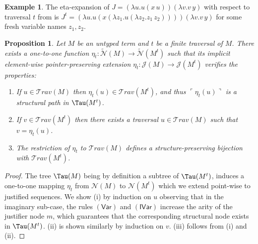 \documentclass[xchauthor,chkrefs,GCNS,amsmath,amsthm,rotating,leaveRGB]{tcsg}
\theoremstyle{plain}
\newtheorem{proposition}[theorem]{Proposition}
\theoremstyle{definition}
\newtheorem{example}{Example}[section]
\newcommand\travset{\mathcal{T}\!rav}
\newcommand{\Nodes}{\mathcal{N}}
\newcommand{\ExtendedNodes}{\tilde{\Nodes}}
\newcommand{\travulc}{\travset}
\newcommand{\ctree}{\Tau}
\begin{document}
\begin{example}
The eta-expansion of $J = (\lambda u . u(x\,u)) (\lambda v . v\,y)$ with
respect to traversal $t$ from  is
$J^{t} = (\lambda u . u(x (\lambda z_{1}. u (\lambda z_{2}.z_{1}\,z_{2}))))
(\lambda v . v\,y)$ for some fresh variable names $z_{1}, z_{2}$.
\end{example}


\begin{proposition}\label{prop:eta_expanded_trav}
Let $M$ be an untyped term and $t$ be a \emph{finite} traversal of $M$. There
exists a one-to-one function $\eta _{t} : \ExtendedNodes (M) \longrightarrow
\ExtendedNodes (M^{t})$ such that its implicit \emph{element-wise
pointer-preserving} extension $\eta _{t} : \mathcal{J}(M) \longrightarrow
\mathcal{J}(M^{t})$ verifies the properties:
%
\begin{enumerate}
\item[\textit{(i)}] If $u \in \travulc (M)$ then $\eta _{t}(u) \in \travulc
    (M^{t})$, and thus $\ulcorner  \eta  _{t}(u) \urcorner  $ is a
    \emph{structural} path in $\ctree (M^{t})$.

\item[\textit{(ii)}] If $v \in \travulc (M^{t})$ then there exists a traversal $u\in
    \travulc (M)$ such that $v = \eta _{t}(u)$.

\item[\textit{(iii)}] The restriction of $\eta _{t}$ to $\mathcal {T}\!rav(M)$
    defines a structure-preserving bijection with $\mathcal
    {T}\!rav(M^{t})$.
\end{enumerate}
\end{proposition}

\begin{proof}
The tree $\ctree (M)$ being by definition a subtree of $\ctree (M^{t})$,
induces a one-to-one mapping $\eta _{t}$ from $\Nodes (M)$ to $\Nodes
(M^{t})$ which we extend point-wise to justified sequences. We show (i) by
induction on $u$ observing that in the imaginary sub-case, the rules
$\mathsf{(Var)}$ and $\mathsf{(IVar)}$ increase the arity of the justifier
node $m$, which guarantees that the corresponding structural node exists in
$\ctree (M^{t})$. (ii) is shown similarly by induction on $v$. (iii) follows
from (i) and (ii).
\end{proof}
\end{document}
